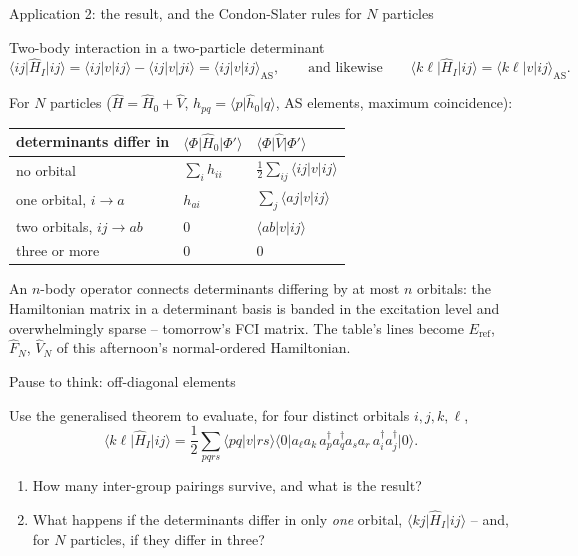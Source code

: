 \documentclass[aspectratio=169,10pt]{beamer}
\newcounter{thinkctr}
\newcommand{\thinkq}[2]{%
  \stepcounter{thinkctr}%
  \begin{tcolorbox}[colback=palewarm,colframe=warm,title={\bfseries Pause to think \#\thethinkctr\hfill\mdseries\small(about #1 min -- discuss with your neighbour)},fonttitle=\bfseries]
  #2
  \end{tcolorbox}}
\newcommand{\mbbox}[1]{%
  \begin{tcolorbox}[colback=paleblue,colframe=uioblue,title={\bfseries Many-body connection}]
  #1
  \end{tcolorbox}}
\newcommand{\ket}[1]{\vert #1\rangle}
\newcommand{\bra}[1]{\langle #1\vert}
\newcommand{\element}[3]{\langle #1\vert #2\vert #3\rangle}
\begin{document}
\begin{frame}{Application 2: the result, and the Condon-Slater rules for $N$ particles}
  \footnotesize\vspace{-0.4em}
  \begin{block}{Two-body interaction in a two-particle determinant}
    \[
      \element{ij}{\hat{H}_I}{ij}
      =\element{ij}{v}{ij}-\element{ij}{v}{ji}
      =\element{ij}{v}{ij}_{\mathrm{AS}},
      \qquad\text{and likewise}\qquad
      \element{k\ell}{\hat{H}_I}{ij}=\element{k\ell}{v}{ij}_{\mathrm{AS}}.
    \]
  \end{block}
  For $N$ particles ($\hat{H}=\hat{H}_0+\hat{V}$, $h_{pq}=\element{p}{\hat{h}_0}{q}$, AS elements, maximum coincidence):
  \begin{center}\footnotesize
  \renewcommand{\arraystretch}{1.1}
  \begin{tabular}{lll}
    \toprule
    determinants differ in & $\element{\Phi}{\hat{H}_0}{\Phi'}$ & $\element{\Phi}{\hat{V}}{\Phi'}$\\
    \midrule
    no orbital & $\sum_i h_{ii}$ & $\frac12\sum_{ij}\element{ij}{v}{ij}$\\
    one orbital, $i\to a$ & $h_{ai}$ & $\sum_j\element{aj}{v}{ij}$\\
    two orbitals, $ij\to ab$ & $0$ & $\element{ab}{v}{ij}$\\
    three or more & $0$ & $0$\\
    \bottomrule
  \end{tabular}
  \end{center}
  \mbbox{\small An $n$-body operator connects determinants differing by at most $n$ orbitals: the Hamiltonian matrix in a determinant basis is \alert{banded in the excitation level} and overwhelmingly sparse -- tomorrow's FCI matrix. The table's lines become $E_{\mathrm{ref}}$, $\hat{F}_N$, $\hat{V}_N$ of this afternoon's normal-ordered Hamiltonian.}
\end{frame}

\begin{frame}{Pause to think: off-diagonal elements}
  \thinkq{4}{Use the generalised theorem to evaluate, for four distinct orbitals $i,j,k,\ell$,
  \[
    \element{k\ell}{\hat{H}_I}{ij}
    =\frac12\sum_{pqrs}\element{pq}{v}{rs}\bra{0}a_\ell a_k\,a_p^{\dagger}a_q^{\dagger}a_sa_r\,a_i^{\dagger}a_j^{\dagger}\ket{0}.
  \]
  \begin{enumerate}
    \item How many inter-group pairings survive, and what is the result?
    \item What happens if the determinants differ in only \emph{one} orbital, $\element{k j}{\hat{H}_I}{ij}$ -- and, for $N$ particles, if they differ in three?
  \end{enumerate}}
\end{frame}
\end{document}
